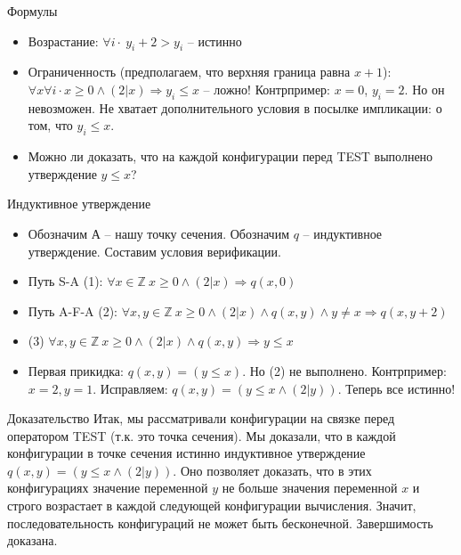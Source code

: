 \documentclass[hyperref={unicode=true}]{beamer}
\begin{document}
    \begin{frame}{Формулы}
    \begin{itemize}
    \item
    Возрастание: $\forall i \cdot~ y_{i} + 2 > y_{i}$ -- истинно
    \item
    Ограниченность (предполагаем, что верхняя граница
    равна $x + 1$): $\forall x \forall i\cdot x \geq 0 \land
    (2|x) \Rightarrow y_{i} \leq x$ -- ложно! Контрпример: $x = 0$,
    $y_i = 2$. Но он невозможен. Не хватает дополнительного
    условия в посылке импликации: о том, что $y_i \leq x$.
    \item
    Можно ли доказать, что на каждой конфигурации
    перед TEST выполнено утверждение $y \leq x$?
    \end{itemize}
    \end{frame}

    \begin{frame}{Индуктивное утверждение}
    \begin{itemize}
    \item
    Обозначим А -- нашу точку сечения.
    Обозначим $q$ -- индуктивное утверждение. Составим
    условия верификации.
    \item
    Путь S-A (1): $\forall x \in \mathbb{Z} ~ x \geq 0 \land (2|x)
    \Rightarrow q(x, 0)$
    \item
    Путь A-F-A (2): $\forall x, y \in \mathbb{Z} ~ x \geq 0
    \land (2|x) \land q(x, y) \land y \neq x \Rightarrow q(x, y + 2)$
    \item
    (3) $\forall x, y \in \mathbb{Z} ~ x \geq 0
    \land (2|x) \land q(x, y) \Rightarrow y \leq x$
    \item
    Первая прикидка: $q(x, y) = (y \leq x)$. Но (2) не выполнено.
    Контрпример: $x = 2, y = 1$. Исправляем: $q(x, y) = (y \leq x
            \land (2|y))$. Теперь все истинно!
    \end{itemize}
    \end{frame}

    \begin{frame}{Доказательство}
    Итак, мы рассматривали конфигурации на связке перед
    оператором TEST (т.к. это точка сечения). Мы доказали, что
    в каждой конфигурации в точке сечения истинно
    индуктивное утверждение $q(x, y) = (y \leq x \land (2|y))$.
    Оно позволяет доказать, что в этих конфигурациях значение
    переменной $y$ не больше значения переменной $x$ и строго
    возрастает в каждой следующей конфигурации вычисления.
    Значит, последовательность конфигураций не может быть
    бесконечной. Завершимость доказана.
    \end{frame}
\end{document}
